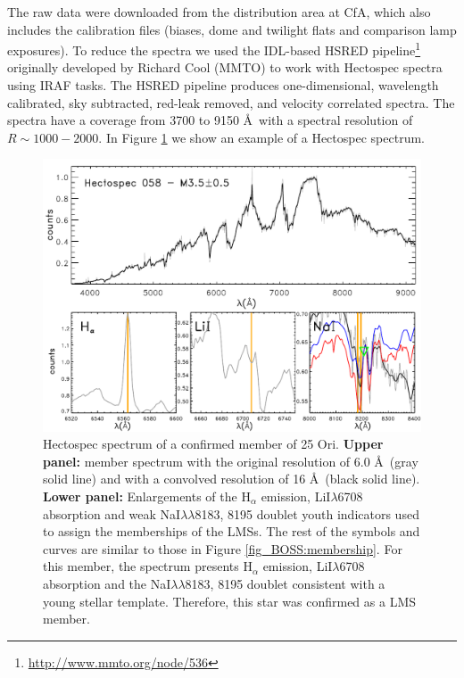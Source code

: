 \documentclass[12pt]{article}
\newcounter{subsubsubsection}[subsubsection]
\begin{document}
\label{sec_Hectospec:targets}
The raw data were downloaded from the distribution area at CfA, which also includes the calibration files (biases, dome and twilight flats and comparison lamp exposures). To reduce the spectra we used the IDL-based HSRED pipeline\footnote{\url{http://www.mmto.org/node/536}} originally developed by Richard Cool (MMTO) to work with Hectospec spectra using IRAF tasks. The HSRED pipeline produces one-dimensional, wavelength calibrated, sky subtracted, red-leak removed, and velocity correlated spectra. The spectra have a coverage from 3700 to 9150 \AA\ with a spectral resolution of $R\sim1000-2000$. In Figure \ref{fig:membership_MMT} we show an example of a Hectospec spectrum.

\begin{figure}[ht!]
	\includegraphics[width=1.0\textwidth]{memberships_Hectospec.pdf}
	\caption[Hectospec spectrum of a confirmed member of 25 Ori.]{Hectospec spectrum of a confirmed member of 25 Ori. \textbf {Upper panel:} member spectrum with the original resolution of 6.0 \AA\ (gray solid line) and with a convolved resolution of 16 \AA\ (black solid line). \textbf {Lower panel:} Enlargements of the H$_\alpha$ emission, LiI$\lambda$6708 absorption and weak NaI$\lambda\lambda$8183, 8195 doublet youth indicators used to assign the memberships of the LMSs. The rest of the symbols and curves are similar to those in Figure \ref{fig_BOSS:membership}. For this member, the spectrum presents H$_\alpha$ emission, LiI$\lambda$6708 absorption and the NaI$\lambda\lambda$8183, 8195 doublet consistent with a young stellar template. Therefore, this star was confirmed as a LMS member.}
	\label{fig:membership_MMT}
\end{figure}
\end{document}

